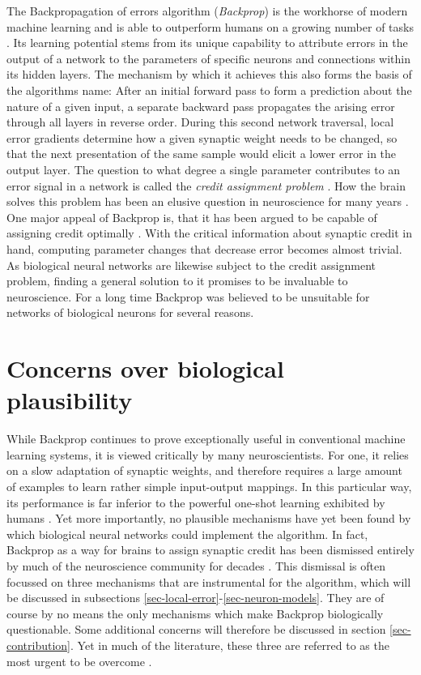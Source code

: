 The Backpropagation of errors algorithm (\textit{Backprop}) \citep{Schmidhuber2014} is the workhorse of modern machine
learning and is able to outperform humans on a growing number of tasks \citep{LeCun2015}. Its learning potential stems
from its unique capability to attribute errors in the output of a network to the parameters of specific neurons and
connections within its hidden layers. The mechanism by which it achieves this also forms the basis of the algorithms
name: After an initial forward pass to form a prediction about the nature of a given input, a separate backward pass
propagates the arising error through all layers in reverse order. During this second network traversal, local error
gradients determine how a given synaptic weight needs to be changed, so that the next presentation of the same sample
would elicit a lower error in the output layer. The question to what degree a single parameter contributes to an error
signal in a network is called the \textit{credit assignment problem} \citep{minsky1961steps}. How the brain solves this
problem has been an elusive question in neuroscience for many years \citep{Schmidhuber2015,Richards2019}. One major
appeal of Backprop is, that it has been argued to be capable of assigning credit optimally \citep{Lillicrap2020}. With
the critical information about synaptic credit in hand, computing parameter changes that decrease error becomes almost
trivial. As biological neural networks are likewise subject to the credit assignment problem, finding a general solution
to it promises to be invaluable to neuroscience. For a long time Backprop was believed to be unsuitable for networks of
biological neurons for several reasons.


\section{Concerns over biological plausibility}

While Backprop continues to prove exceptionally useful in conventional machine learning systems, it is viewed critically
by many neuroscientists. For one, it relies on a slow adaptation of synaptic weights, and therefore requires a large
amount of examples to learn rather simple input-output mappings. In this particular way, its performance is far inferior
to the powerful one-shot learning exhibited by humans \citep{Brea2016}. Yet more importantly, no plausible mechanisms
have yet been found by which biological neural networks could implement the algorithm. In fact, Backprop as a way for
brains to assign synaptic credit has been dismissed entirely by much of the neuroscience community for decades
\citep{Grossberg1987,Crick1989,Mazzoni1991,OReilly1996}. This dismissal is often focussed on three mechanisms that are
instrumental for the algorithm, which will be discussed in subsections \ref{sec-local-error}-\ref{sec-neuron-models}.
They are of course by no means the only mechanisms which make Backprop biologically questionable. Some additional
concerns will therefore be discussed in section \ref{sec-contribution}. Yet in much of the literature, these three are
referred to as the most urgent to be overcome \citep{whittington2019theories,Bengio2015,Liao2016}.


